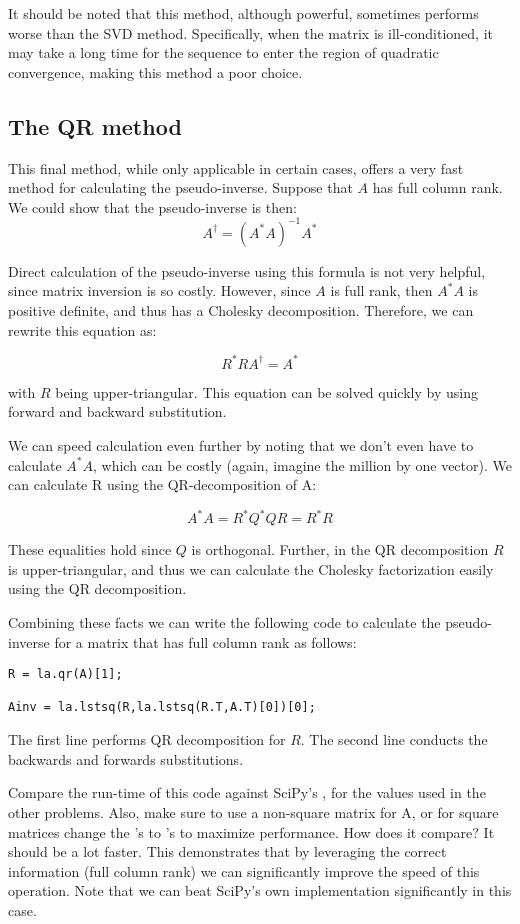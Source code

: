 It should be noted that this method, although powerful, sometimes performs worse than the SVD method. Specifically, when the matrix is ill-conditioned, it may take a long time for the sequence to enter the region of quadratic convergence, making this method a poor choice.

\subsection*{The QR method}

This final method, while only applicable in certain cases, offers a very fast method for calculating the pseudo-inverse. Suppose that $A$ has full column rank. We could show that the pseudo-inverse is then:
\[
A^\dagger = (A^* A)^{-1} A^*
\]

Direct calculation of the pseudo-inverse using this formula is not very helpful, since matrix inversion is so costly. However, since $A$ is full rank, then $A^*A$ is positive definite, and thus has a Cholesky decomposition. Therefore, we can rewrite this equation as:

\[
R^*R A^\dagger = A^*
\]

with $R$ being upper-triangular. This equation can be solved quickly by using forward and backward substitution.

We can speed calculation even further by noting that we don't even have to calculate $A^* A$, which can be costly (again, imagine the million by one vector). We can calculate R using the QR-decomposition of A:

\[
A^* A = R^*Q^*QR = R^* R
\]

These equalities hold since $Q$ is orthogonal. Further, in the QR decomposition $R$ is upper-triangular, and thus we can calculate the Cholesky factorization easily using the QR decomposition.

Combining these facts we can write the following code to calculate the pseudo-inverse for a matrix that has full column rank as follows:

\begin{lstlisting}
R = la.qr(A)[1];

Ainv = la.lstsq(R,la.lstsq(R.T,A.T)[0])[0];
\end{lstlisting}


The first line performs QR decomposition for $R$. The second line conducts the backwards and forwards substitutions.

\begin{problem}
Compare the run-time of this code against SciPy's , for the values used in the other problems. Also, make sure to use a non-square matrix for A, or for square matrices change the 's to 's to maximize performance.  How does it compare? It should be a lot faster. This demonstrates that by leveraging the correct information (full column rank) we can significantly improve the speed of this operation. Note that we can beat SciPy's own implementation significantly in this case.

\end{problem}

